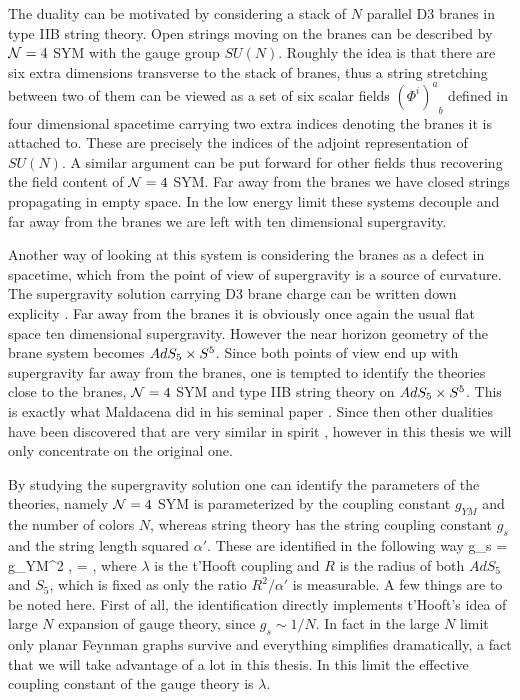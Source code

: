 The duality can be motivated by considering a stack of $N$ parallel D3 branes in type IIB string theory. 
Open strings moving on the branes can be described by $\mathcal{N}=4$ SYM with the gauge group $SU(N)$. 
Roughly the idea is that there are six extra dimensions transverse to the stack of branes, thus a string stretching between two of them can be viewed as a set of six scalar fields ${(\Phi^i)^a}_b$ defined in four dimensional spacetime carrying two extra indices denoting the branes it is attached to. 
These are precisely the indices of the adjoint representation of $SU(N)$.
A similar argument can be put forward for other fields thus recovering the field content of $\mathcal{N}=4$ SYM.
Far away from the branes we have closed strings propagating in empty space. 
In the low energy limit these systems decouple and far away from the branes we are left with ten dimensional supergravity.

Another way of looking at this system is considering the branes as a defect in spacetime, which from the point of view of supergravity is a source of curvature. 
The supergravity solution carrying D3 brane charge can be written down explicity \cite{Horowitz:1991cd}.
Far away from the branes it is obviously once again the usual flat space ten dimensional supergravity.
However the near horizon geometry of the brane system becomes $AdS_5 \times S^5$.
Since both points of view end up with supergravity far away from the branes, one is tempted to identify the theories close to the branes, $\mathcal{N}=4$ SYM and type IIB string theory on $AdS_5 \times S^5$. 
This is exactly what Maldacena did in his seminal paper \cite{Maldacena:1997re}. Since then other dualities have been discovered that are very similar in spirit \cite{Aharony:2008ug}, however in this thesis we will only concentrate on the original one.

By studying the supergravity solution one can identify the parameters of the theories, namely $\mathcal{N}=4$ SYM is parameterized by the coupling constant $g_{YM}$ and the number of colors $N$, whereas string theory has the string coupling constant $g_s$ and the string length squared $\alpha'$. 
These are identified in the following way
\pi g_s = g_{YM}^2 \equiv {}, \;\;\;\;\;\;\;  = \lambda,
\eeq
where $\lambda$ is the t'Hooft coupling and $R$ is the radius of both $AdS_5$ and $S_5$, which is fixed as only the ratio $R^2/\alpha'$ is measurable.
A few things are to be noted here. First of all, the identification directly implements t'Hooft's idea of large $N$ expansion of gauge theory, since $g_s \sim 1/N$. 
In fact in the large $N$ limit only planar Feynman graphs survive and everything simplifies dramatically, a fact that we will take advantage of a lot in this thesis.
In this limit the effective coupling constant of the gauge theory is $\lambda$. 

